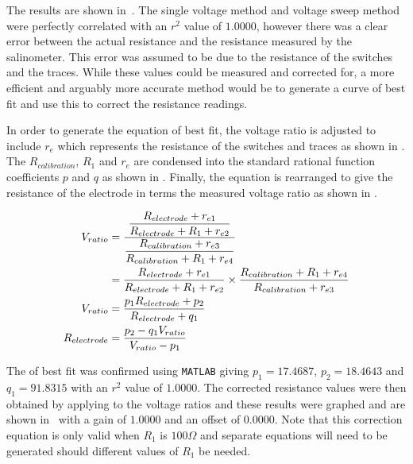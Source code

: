 The results are shown in~. 
The single voltage method and voltage sweep method were perfectly correlated with an $r^2$ value of $1.0000$, however there was a clear error between the actual resistance and the resistance measured by the salinometer.
This error was assumed to be due to the resistance of the switches and the traces.
While these values could be measured and corrected for, a more efficient and arguably more accurate method would be to generate a curve of best fit and use this to correct the resistance readings.

In order to generate the equation of best fit, the voltage ratio  is adjusted to include $r_e$ which represents the resistance of the switches and traces as shown in .
The $R_{calibration}$, $R_1$ and $r_e$ are condensed into the standard rational function coefficients $p$ and $q$ as shown in .
Finally, the equation is rearranged to give the resistance of the electrode in terms the measured voltage ratio as shown in .

\begin{align}
    V_{ratio} &= \frac{\displaystyle \frac{\displaystyle R_{electrode} + r_{e1}}{\displaystyle R_{electrode} + R_1 + r_{e2}}}{\displaystyle \frac{\displaystyle R_{calibration} + r_{e3}}{\displaystyle R_{calibration} + R_1 + r_{e4}}} \nonumber \\
    &= \frac{\displaystyle R_{electrode} + r_{e1}}{\displaystyle R_{electrode} + R_1 + r_{e2}} \times \frac{\displaystyle R_{calibration} + R_1 + r_{e4}}{\displaystyle R_{calibration} + r_{e3}} \label{eqn:resistance-measuring} \\
    V_{ratio} &= \frac{\displaystyle p_1 R_{electrode} + p_2}{\displaystyle R_{electrode} + q_1} \label{eqn:resistance-measuring-rational} \\
    R_{electrode} &= \frac{\displaystyle p_2 - q_1 V_{ratio}}{\displaystyle V_{ratio} - p_1} \label{eqn:resistance-measuring-rearranged}
\end{align}

The  of best fit was confirmed using \texttt{MATLAB} giving $p_1 = 17.4687$, $p_2 = 18.4643$ and $q_1 = 91.8315$ with an $r^2$ value of $1.0000$. 
The corrected resistance values were then obtained by applying  to the voltage ratios and these results were graphed and are shown in~ with a gain of $1.0000$ and an offset of $0.0000$.
Note that this correction equation is only valid when $R_1$ is $100\Omega$ and separate equations will need to be generated should different values of $R_1$ be needed.

